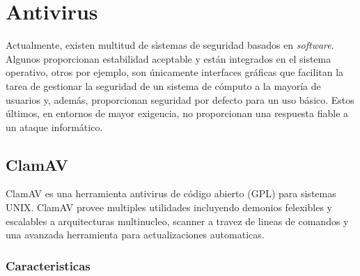 \section{Antivirus}

Actualmente, existen multitud de sistemas de seguridad basados en
\emph{software}. Algunos proporcionan estabilidad aceptable y están integrados
en el sistema operativo, otros por ejemplo, son únicamente interfaces gráficas
que facilitan la tarea de gestionar la seguridad de un sistema de cómputo a la
mayoría de usuarios y, además, proporcionan seguridad por defecto para un uso
básico. Estos últimos, en entornos de mayor exigencia, no proporcionan una
respuesta fiable a un ataque informático.


\subsection{ClamAV}

ClamAV es una herramienta antivirus de código abierto (GPL) para sistemas UNIX.
ClamAV provee multiples  utilidades incluyendo  demonios felexibles y
escalables a  arquitecturas multinucleo, scanner a  travez de  lineas de
comandos y una  avanzada herramienta para actualizaciones automaticas.

\subsubsection{Caracteristicas}

